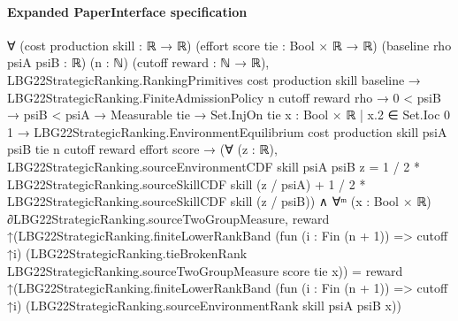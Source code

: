 \documentclass[10pt]{article}
\begin{document}
\paragraph{Expanded PaperInterface specification}
\begin{ReviewVerbatim}
∀ (cost production skill : ℝ → ℝ) (effort score tie : Bool × ℝ → ℝ) (baseline rho psiA psiB : ℝ) (n : ℕ)
  (cutoff reward : ℕ → ℝ),
  LBG22StrategicRanking.RankingPrimitives cost production skill baseline →
    LBG22StrategicRanking.FiniteAdmissionPolicy n cutoff reward rho →
      0 < psiB →
        psiB < psiA →
          Measurable tie →
            Set.InjOn tie {x : Bool × ℝ | x.2 ∈ Set.Ioc 0 1} →
              LBG22StrategicRanking.EnvironmentEquilibrium cost production skill psiA psiB tie n cutoff reward effort
                  score →
                (∀ (z : ℝ),
                    LBG22StrategicRanking.sourceEnvironmentCDF skill psiA psiB z =
                      1 / 2 * LBG22StrategicRanking.sourceSkillCDF skill (z / psiA) +
                        1 / 2 * LBG22StrategicRanking.sourceSkillCDF skill (z / psiB)) ∧
                  ∀ᵐ (x : Bool × ℝ) ∂LBG22StrategicRanking.sourceTwoGroupMeasure,
                    reward
                        ↑(LBG22StrategicRanking.finiteLowerRankBand (fun (i : Fin (n + 1)) => cutoff ↑i)
                            (LBG22StrategicRanking.tieBrokenRank LBG22StrategicRanking.sourceTwoGroupMeasure score tie
                              x)) =
                      reward
                        ↑(LBG22StrategicRanking.finiteLowerRankBand (fun (i : Fin (n + 1)) => cutoff ↑i)
                            (LBG22StrategicRanking.sourceEnvironmentRank skill psiA psiB x))
\end{ReviewVerbatim}
\end{document}
